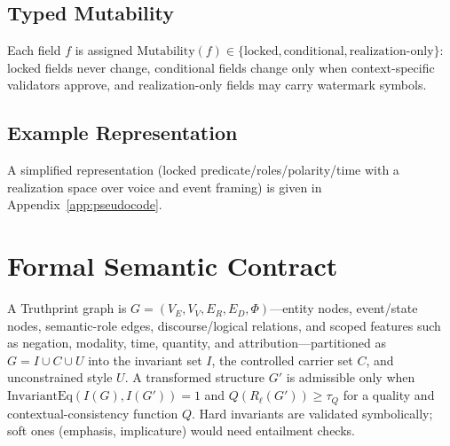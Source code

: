 \documentclass[11pt]{article}
\begin{document}
\subsection{Typed Mutability}
Each field $f$ is assigned $\mathrm{Mutability}(f)\in\{\mathrm{locked},\mathrm{conditional},\mathrm{realization\mbox{-}only}\}$: locked fields never change, conditional fields change only when context-specific validators approve, and realization-only fields may carry watermark symbols.

\subsection{Example Representation}
A simplified representation (locked predicate/roles/polarity/time with a realization space over voice and event framing) is given in Appendix~\ref{app:pseudocode}.
\section{Formal Semantic Contract}
A Truthprint graph is $G=(V_E,V_V,E_R,E_D,\Phi)$---entity nodes, event/state nodes, semantic-role edges, discourse/logical relations, and scoped features such as negation, modality, time, quantity, and attribution---partitioned as $G=I\cup C\cup U$ into the invariant set $I$, the controlled carrier set $C$, and unconstrained style $U$. A transformed structure $G'$ is admissible only when $\mathrm{InvariantEq}(I(G),I(G'))=1$ and $Q(R_\ell(G'))\ge\tau_Q$ for a quality and contextual-consistency function $Q$. Hard invariants are validated symbolically; soft ones (emphasis, implicature) would need entailment checks.
\end{document}
